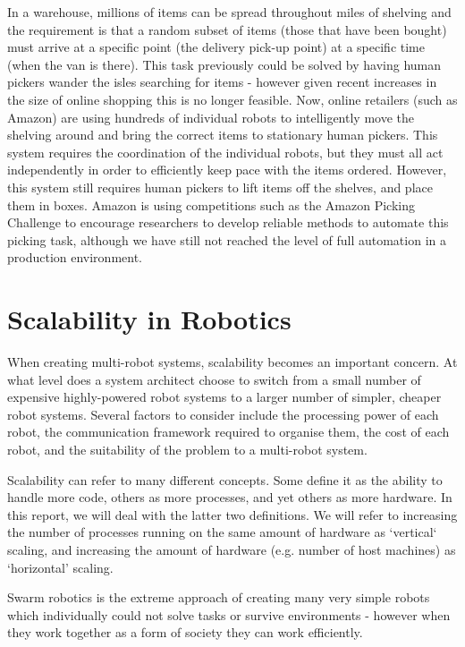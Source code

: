 \documentclass[../dissertation.tex]{subfiles}
\begin{document}
In a warehouse, millions of items can be spread throughout miles of shelving and the requirement is that a random subset of items (those that have been bought) must arrive at a specific point (the delivery pick-up point) at a specific time (when the van is there). This task previously could be solved by having human pickers wander the isles searching for items - however given recent increases in the size of online shopping this is no longer feasible. Now, online retailers (such as Amazon) are using hundreds of individual robots to intelligently move the shelving around and bring the correct items to stationary human pickers\cite{wurman2008coordinating}. This system requires the coordination of the individual robots, but they must all act independently in order to efficiently keep pace with the items ordered. However, this system still requires human pickers to lift items off the shelves, and place them in boxes. Amazon is using competitions such as the Amazon Picking Challenge to encourage researchers to develop reliable methods to automate this picking task\cite{correll2016lessons}, although we have still not reached the level of full automation in a production environment.

\section{Scalability in Robotics}

When creating multi-robot systems, scalability becomes an important concern\cite{klavins2004communication}. At what level does a system architect choose to switch from a small number of expensive highly-powered robot systems to a larger number of simpler, cheaper robot systems. Several factors to consider include the processing power of each robot, the communication framework required to organise them, the cost of each robot, and the suitability of the problem to a multi-robot system.

Scalability can refer to many different concepts. Some define it as the ability to handle more code, others as more processes, and yet others as more hardware\cite{Bondi:2000:CSI:350391.350432}. In this report, we will deal with the latter two definitions. We will refer to increasing the number of processes running on the same amount of hardware as `vertical` scaling, and increasing the amount of hardware (e.g. number of host machines) as `horizontal' scaling.

Swarm robotics is the extreme approach of creating many very simple robots which individually could not solve tasks or survive environments - however when they work together as a form of society they can work efficiently\cite{csahin2004swarm}.
\end{document}
